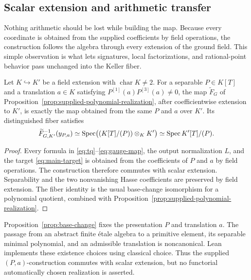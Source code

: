 \subsection{Scalar extension and arithmetic transfer}
\label{sec:realization}

Nothing arithmetic should be lost while building the map.  Because every
coordinate is obtained from the supplied coefficients by field operations,
the construction follows the algebra through every extension of the ground
field.  This simple observation is what lets signatures, local
factorizations, and rational-point behavior pass unchanged into the Keller
fiber.

\begin{proposition}
\label{prop:base-change}
Let \(K\hookrightarrow K'\) be a field extension with
\(\operatorname{char}K\neq2\).  For a separable \(P\in K[T]\) and a
translation \(a\in K\) satisfying
\(P^{[1]}(a)P^{[3]}(a)\neq0\), the map \(\widetilde F_G\) of
Proposition~\ref{prop:supplied-polynomial-realization}, after coefficientwise
extension to
\(K'\), is exactly the map obtained from the same \(P\) and \(a\) over
\(K'\).  Its distinguished fiber satisfies
\[
 \widetilde F_{G,K'}^{-1}(y_{P,a})
 \simeq
 \operatorname{Spec}\bigl((K[T]/(P))\otimes_KK'\bigr)
 \simeq
 \operatorname{Spec} K'[T]/(P).
\]
\end{proposition}

\begin{proof}
Every formula in \eqref{eq:tq}--\eqref{eq:gauge-map}, the output
normalization \(L\), and the target \eqref{eq:main-target} is obtained from
the coefficients of \(P\) and \(a\) by field operations.  The construction
therefore commutes with scalar extension.  Separability and the two
nonvanishing Hasse coefficients are preserved by field extension.  The
fiber identity is the usual base-change isomorphism for a polynomial
quotient, combined with
Proposition~\ref{prop:supplied-polynomial-realization}.
\end{proof}

\begin{remark}\label{rem:base-change-choice}
Proposition~\ref{prop:base-change} fixes the presentation \(P\) and
translation \(a\).  The passage from an abstract finite \'etale algebra to a
primitive element, its separable minimal polynomial, and an admissible
translation is noncanonical.  Lean implements these existence choices using
classical choice.  Thus the supplied \((P,a)\)-construction commutes with
scalar extension, but no functorial automatically chosen realization is
asserted.
\end{remark}

